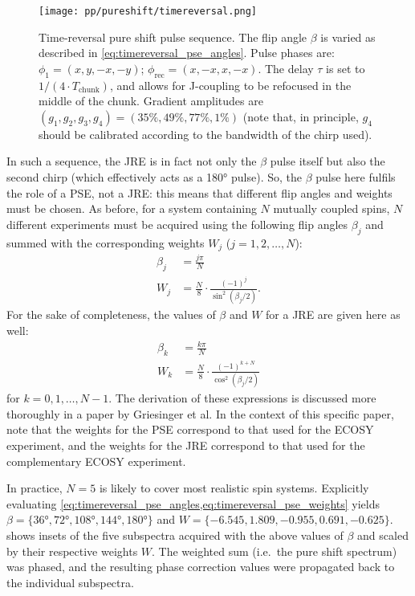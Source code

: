 \begin{figure}[htb]
    \centering
    \texttt{[image: pp/pureshift/timereversal.png]}%
    \caption[Time-reversal pure shift pulse sequence]{
        Time-reversal pure shift pulse sequence.
        The flip angle $\beta$ is varied as described in \cref{eq:timereversal_pse_angles}.
        Pulse phases are: $\phi_1 = (x, y, -x, -y)$; $\phi_\text{rec} = (x, -x, x, -x)$.
        The delay $\tau$ is set to $1/(4 \cdot T_\text{chunk})$, and allows for J-coupling to be refocused in the middle of the chunk.
        Gradient amplitudes are $(g_1, g_2, g_3, g_4) = (35\%, 49\%, 77\%, 1\%)$ (note that, in principle, $g_4$ should be calibrated according to the bandwidth of the chirp used).
    }
    \label{fig:timereversal_pulseq}
\end{figure}

In such a sequence, the JRE is in fact not only the $\beta$ pulse itself but also the second chirp (which effectively acts as a \ang{180} pulse).
So, the $\beta$ pulse here fulfils the role of a PSE, not a JRE: this means that different flip angles and weights must be chosen.
As before, for a system containing $N$ mutually coupled spins, $N$ different experiments must be acquired using the following flip angles $\beta_j$ and summed with the corresponding weights $W_j$ ($j = 1, 2, \ldots, N$):
\begin{align}
    \beta_j &= \frac{j\pi}{N} \label{eq:timereversal_pse_angles} \\
    W_j &= \frac{N}{8}\cdot \frac{(-1)^j}{\sin^2(\beta_j/2)} \label{eq:timereversal_pse_weights}.
\end{align}
For the sake of completeness, the values of $\beta$ and $W$ for a JRE are given here as well:
\begin{align}
    \beta_k &= \frac{k\pi}{N} \label{eq:timereversal_jre_angles} \\
    W_k &= \frac{N}{8}\cdot \frac{(-1)^{k + N}}{\cos^2(\beta_j/2)} \label{eq:timereversal_jre_weights}
\end{align}
for $k = 0, 1, \ldots, N-1$.
The derivation of these expressions is discussed more thoroughly in a paper by Griesinger et al.\autocite{Griesinger1986JCP}
In the context of this specific paper, note that the weights for the PSE correspond to that used for the ECOSY experiment, and the weights for the JRE correspond to that used for the complementary ECOSY experiment.

In practice, $N = 5$ is likely to cover most realistic spin systems.
Explicitly evaluating \cref{eq:timereversal_pse_angles,eq:timereversal_pse_weights} yields $\beta = \{\ang{36}, \ang{72}, \ang{108}, \ang{144}, \ang{180}\}$ and $W = \{−6.545,1.809,−0.955,0.691,−0.625\}$.
 shows insets of the five subspectra acquired with the above values of $\beta$ and scaled by their respective weights $W$.
The weighted sum (i.e.\ the pure shift spectrum) was phased, and the resulting phase correction values were propagated back to the individual subspectra.

